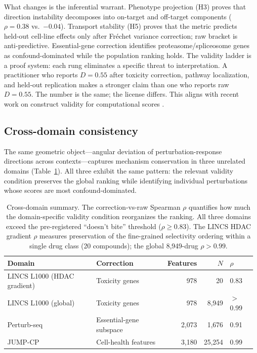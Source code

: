 \documentclass{article}
\begin{document}
What changes is the inferential warrant. Phenotype projection (H3) proves
that direction instability decomposes into on-target and off-target
components ($\rho = 0.38$ vs.\ $-0.04$). Transport stability (H5) proves
that the metric predicts held-out cell-line effects only after Fr\'{e}chet
variance correction; raw bracket is anti-predictive. Essential-gene
correction identifies proteasome/spliceosome genes as confound-dominated
while the population ranking holds. The validity ladder is a proof system:
each rung eliminates a specific threat to interpretation. A practitioner who
reports $D = 0.55$ after toxicity correction, pathway localization, and
held-out replication makes a stronger claim than one who reports raw
$D = 0.55$. The number is the same; the license differs. This aligns with
recent work on construct validity for computational scores
\citep{freiesleben2025benchmarking,watson2025measuring}.

\subsection{Cross-domain consistency}

The same geometric object---angular deviation of perturbation-response
directions across contexts---captures mechanism conservation in three
unrelated domains (Table~\ref{tab:cross_domain}). All three exhibit the
same pattern: the relevant validity condition preserves the global ranking
while identifying individual perturbations whose scores are most
confound-dominated.

\begin{table}[t]
\centering
\caption{Cross-domain summary. The correction-vs-raw Spearman $\rho$
quantifies how much the domain-specific validity condition reorganizes
the ranking. All three domains exceed the pre-registered ``doesn't bite''
threshold ($\rho \geq 0.83$). The LINCS HDAC gradient $\rho$ measures
preservation of the fine-grained selectivity ordering within a single drug
class (20 compounds); the global 8{,}949-drug $\rho > 0.99$.}
\label{tab:cross_domain}
\small
\begin{tabular}{llrrl}
\toprule
Domain & Correction & Features & $N$ & $\rho$ \\
\midrule
LINCS L1000 (HDAC gradient) & Toxicity genes & 978 & 20 & 0.83 \\
LINCS L1000 (global) & Toxicity genes & 978 & 8{,}949 & $>$0.99 \\
Perturb-seq & Essential-gene subspace & 2{,}073 & 1{,}676 & 0.91 \\
JUMP-CP & Cell-health features & 3{,}180 & 25{,}254 & 0.99 \\
\bottomrule
\end{tabular}
\end{table}
\end{document}
